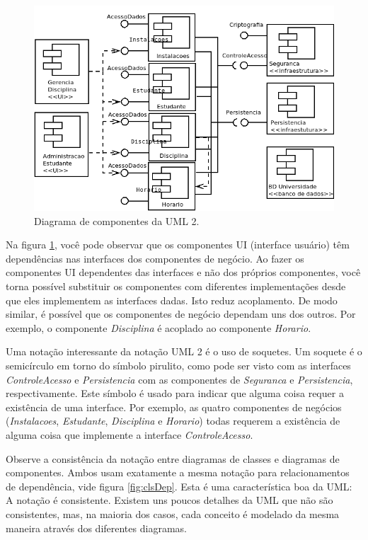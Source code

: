 \documentclass[
	11pt,				%
	openright,
	twoside,			%
	a4paper,			%
	english,			%
	french,
	brazil,				%
	sumario=tradicional
	]{abntex2}
\begin{document}
\begin{figure}
\begin{center}
\includegraphics[scale=0.5]{componente.png}
\end{center}
\caption{Diagrama de componentes da UML 2.} \label{fig:compo}
\end{figure}

Na figura \ref{fig:compo}, você pode observar que os componentes UI (interface usuário) têm dependências nas interfaces dos componentes de negócio. Ao fazer os componentes UI dependentes das interfaces e não dos próprios componentes, você torna possível substituir os componentes com diferentes implementações desde que eles implementem as interfaces dadas. Isto reduz acoplamento. De modo similar, é possível que os componentes de negócio dependam uns dos outros. Por exemplo, o componente \emph{Disciplina} é acoplado ao componente \emph{Horario}. 

Uma notação interessante da notação UML 2 é o uso de soquetes. Um soquete é o semicírculo em torno do símbolo pirulito, como pode ser visto com as interfaces \emph{ControleAcesso} e \emph{Persistencia} com as componentes de \emph{Seguranca} e \emph{Persistencia}, respectivamente. Este símbolo é usado para indicar que alguma coisa requer a existência de uma interface. Por exemplo, as quatro componentes de negócios (\emph{Instalacoes}, \emph{Estudante}, \emph{Disciplina} e \emph{Horario}) todas requerem a existência de alguma coisa que implemente a interface \emph{ControleAcesso}.

Observe a consistência da notação entre diagramas de classes e diagramas de componentes. Ambos usam exatamente a mesma notação para relacionamentos de dependência, vide figura \ref{fig:clsDep}. Esta é uma característica boa da UML: A notação é consistente. Existem uns poucos detalhes da UML que não são consistentes, mas, na maioria dos casos, cada conceito é modelado da mesma maneira através dos diferentes diagramas.
\end{document}
